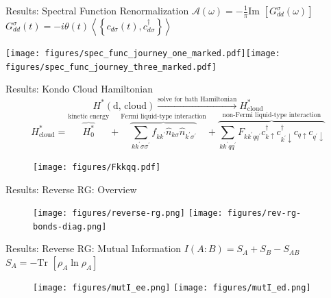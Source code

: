 \documentclass[aspectratio=169]{beamer}
\begin{document}
\begin{frame}{Results: Spectral Function Renormalization}
	\(\mathcal{A(\omega)} = -\frac{1}{\pi}\text{Im }\left[G_{d d}^\sigma\left( \omega \right) \right]\) \hspace*{\fill} \(G_{d d}^\sigma\left(t\right) = -i\theta(t)\left<\left\{ c_{d\sigma}(t), c^\dagger_{d\sigma} \right\}\right>\)
\begin{center}
	\texttt{[image: figures/spec\_func\_journey\_one\_marked.pdf]}\hspace*{\fill}\texttt{[image: figures/spec\_func\_journey\_three\_marked.pdf]}
\end{center}
\end{frame}

\begin{frame}{Results: Kondo Cloud Hamiltonian}
	\vspace*{-10pt}
	\[H^*(\text{d, cloud}) \xrightarrow{\text{solve for bath Hamiltonian}} H^*_\text{cloud}\] 
	\[H^*_\text{cloud} = \overbrace{H^*_0}^\text{kinetic energy} + \overbrace{\sum_{kk^\prime\sigma\sigma^\prime}f_{kk^\prime}\hat n_{k\sigma}\hat n_{k^\prime\sigma^\prime}}^\text{Fermi liquid-type interaction} + \overbrace{\sum_{kk^\prime qq^\prime}F_{kk^\prime qq^\prime}c^\dagger_{k \uparrow}c^\dagger_{k^\prime \downarrow} c_{q \uparrow}c_{q^\prime \downarrow}}^\text{non-Fermi liquid-type interaction}\]
\begin{figure}[htpb]
	\centering
	\texttt{[image: figures/Fkkqq.pdf]}
\end{figure}
\end{frame}

\begin{frame}{Results: Reverse RG: Overview}
	\vspace*{\fill}
	\begin{figure}[htpb]
		\centering
		\texttt{[image: figures/reverse-rg.png]}
		\hspace*{\fill}
		\texttt{[image: figures/rev-rg-bonds-diag.png]}
	\end{figure}
	\vspace*{\fill}
\end{frame}

\begin{frame}{Results: Reverse RG: Mutual Information}
	\hspace*{\fill}	\(I(A:B) = S_A + S_B - S_{AB}\)\hspace*{\fill}\(S_A = -\text{Tr }\left[\rho_A \ln \rho_A\right]\)\hspace*{\fill}
	\begin{figure}[htpb]
		\centering
		\texttt{[image: figures/mutI\_ee.png]}\hspace*{\fill}
		\texttt{[image: figures/mutI\_ed.png]}
	\end{figure}
\end{frame}
\end{document}
